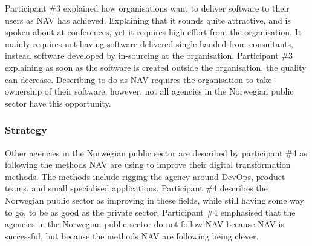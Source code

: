 Participant \#3 explained how organisations want to deliver software to their users as NAV has achieved. Explaining that it sounds quite attractive, and is spoken about at conferences, yet it requires high effort from the organisation. It mainly requires not having software delivered single-handed from consultants, instead software developed by in-sourcing at the organisation. Participant \#3 explaining as soon as the software is created outside the organisation, the quality can decrease. Describing to do as NAV requires the organisation to take ownership of their software, however, not all agencies in the Norwegian public sector have this opportunity.



\subsubsection{Strategy} \label{sec:strategy}
Other agencies in the Norwegian public sector are described by participant \#4 as following the methods NAV are using to improve their digital transformation methods. The methods include rigging the agency around DevOps, product teams, and small specialised applications. Participant \#4 describes the Norwegian public sector as improving in these fields, while still having some way to go, to be as good as the private sector. Participant \#4 emphasised that the agencies in the Norwegian public sector do not follow NAV because NAV is successful, but because the methods NAV are following being clever.

